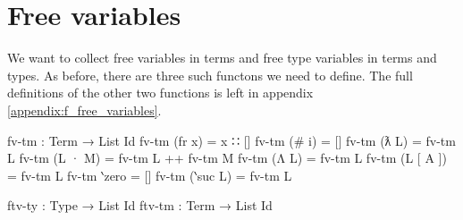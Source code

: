 \documentclass[logo,bsc,singlespacing,parskip,online]{infthesis}
\begin{document}
\section{Free variables}
We want to collect free variables in terms and free type variables in terms and types. As before,
there are three such functons we need to define. The full definitions of the other two functions is
left in appendix \ref{appendix:f_free_variables}.
\begin{code}
  fv-tm : Term → List Id
  fv-tm (fr x) = x ∷ []
  fv-tm (# i) = []
  fv-tm (ƛ L) = fv-tm L
  fv-tm (L · M) = fv-tm L ++ fv-tm M
  fv-tm (Λ L) = fv-tm L
  fv-tm (L [ A ]) = fv-tm L
  fv-tm ‵zero = []
  fv-tm (‵suc L) = fv-tm L

  ftv-ty : Type → List Id
  ftv-tm : Term → List Id
\end{code}
\begin{comment}
\begin{code}
  -- We're actually gonna something really sneaky here.
  -- We're including the full body here because Agda needs it to
  -- be defined so that it can use the definition in later proofs.
  -- So I'm just gonna copy-paste the body as non-Agda code later.

  ftv-ty ‵ℕ = []
  ftv-ty (t-fr x) = x ∷ []
  ftv-ty (t-# i) = []
  ftv-ty (A ⇒ B) = ftv-ty A ++ ftv-ty B
  ftv-ty (t-∀ A) = ftv-ty A

  ftv-tm (fr x) = []
  ftv-tm (# i) = []
  ftv-tm (ƛ L) = ftv-tm L
  ftv-tm (L · M) = ftv-tm L ++ ftv-tm M
  ftv-tm (Λ L) = ftv-tm L
  ftv-tm (L [ A ]) = ftv-tm L ++ ftv-ty A
  ftv-tm ‵zero = []
  ftv-tm (‵suc L) = ftv-tm L
\end{code}
\end{comment}
\end{document}
